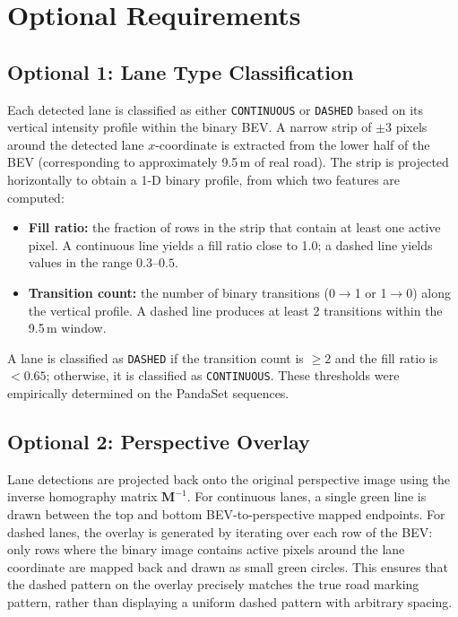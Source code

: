 \documentclass[11pt,a4paper]{article}
\begin{document}
\section{Optional Requirements}

\subsection{Optional 1: Lane Type Classification}
\label{sec:classification}

Each detected lane is classified as either \texttt{CONTINUOUS} or \texttt{DASHED} based on its vertical intensity profile within the binary BEV. A narrow strip of $\pm 3$ pixels around the detected lane $x$-coordinate is extracted from the lower half of the BEV (corresponding to approximately 9.5\,m of real road). The strip is projected horizontally to obtain a 1-D binary profile, from which two features are computed:

\begin{itemize}
    \item \textbf{Fill ratio:} the fraction of rows in the strip that contain at least one active pixel. A continuous line yields a fill ratio close to 1.0; a dashed line yields values in the range $0.3$--$0.5$.
    \item \textbf{Transition count:} the number of binary transitions (0$\to$1 or 1$\to$0) along the vertical profile. A dashed line produces at least 2 transitions within the 9.5\,m window.
\end{itemize}

A lane is classified as \texttt{DASHED} if the transition count is $\geq 2$ and the fill ratio is $< 0.65$; otherwise, it is classified as \texttt{CONTINUOUS}. These thresholds were empirically determined on the PandaSet sequences.


\subsection{Optional 2: Perspective Overlay}
\label{sec:overlay}

Lane detections are projected back onto the original perspective image using the inverse homography matrix $\mathbf{M}^{-1}$. For continuous lanes, a single green line is drawn between the top and bottom BEV-to-perspective mapped endpoints. For dashed lanes, the overlay is generated by iterating over each row of the BEV: only rows where the binary image contains active pixels around the lane coordinate are mapped back and drawn as small green circles. This ensures that the dashed pattern on the overlay precisely matches the true road marking pattern, rather than displaying a uniform dashed pattern with arbitrary spacing.
\end{document}

